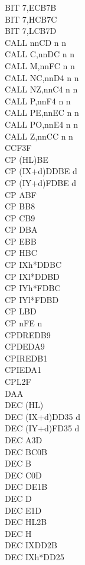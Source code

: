 \documentclass[oneside,a4paper]{book}
\begin{document}
\begin{multicols}{3}
{\begin{tabbing}
BIT 7,E\>CB7B\\
BIT 7,H\>CB7C\\
BIT 7,L\>CB7D\\
CALL nn\>CD n n\\
CALL C,nn\>DC n n\\
CALL M,nn\>FC n n\\
CALL NC,nn\>D4 n n\\
CALL NZ,nn\>C4 n n\\
CALL P,nn\>F4 n n\\
CALL PE,nn\>EC n n\\
CALL PO,nn\>E4 n n\\
CALL Z,nn\>CC n n\\
CCF\>3F\\
CP (HL)\>BE\\
CP (IX+d)\>DDBE d\\
CP (IY+d)\>FDBE d\\
CP A\>BF\\
CP B\>B8\\
CP C\>B9\\
CP D\>BA\\
CP E\>BB\\
CP H\>BC\\
CP IXh*\>DDBC\\
CP IXl*\>DDBD\\
CP IYh*\>FDBC\\
CP IYl*\>FDBD\\
CP L\>BD\\
CP n\>FE n\\
CPDR\>EDB9\\
CPD\>EDA9\\
CPIR\>EDB1\\
CPI\>EDA1\\
CPL\>2F\\
DAA\\
DEC (HL)\\
DEC (IX+d)\>DD35 d\\
DEC (IY+d)\>FD35 d\\
DEC A\>3D\\
DEC BC\>0B\\
DEC B\\
DEC C\>0D\\
DEC DE\>1B\\
DEC D\\
DEC E\>1D\\
DEC HL\>2B\\
DEC H\\
DEC IX\>DD2B\\
DEC IXh*\>DD25\\

\end{tabbing}}
\end{multicols}
\end{document}
